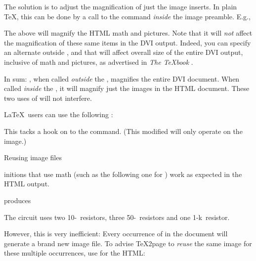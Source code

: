 {{{{{{{{{{{{{{The solution is to adjust the magnification of  just
the image inserts.  In plain \TeX, this can be
done by a call to the \p{\magnification} command {\em
inside} the image preamble.  E.g.,


\n The above will magnify the HTML math and pictures.
Note that it will {\em not} affect the magnification
of these same items in the DVI output.  Indeed,
you can specify an alternate \p{\magnification}
outside \p{\imgpreamble}, and that will affect
overall size of the entire DVI output, inclusive of
math and pictures, as advertised in {\em The \TeX book}
\cite{texbook}.

In sum: \p{\magnification}, when called {\em
outside} the \p{\imgpreamble}, magnifies the
entire DVI document.  When called {\em inside}
the \p{\imgpreamble}, it will magnify  just the
images in the HTML document.  These two uses
of \p{\magnification} will not interfere.

\LaTeX\ users can use the following%
\iffalse, but there
must be a better way\fi:

\p{
\ifx\shipout\UnDeFiNeD
  \imgpreamble
    \let\LaTeXdocument\document
    \def\document{\LaTeXdocument\Large}
  \endimgpreamble
\fi
}

This tacks a hook on to the \p{\document} command.
(This modified \p{\document} will only operate
on the image.)

\beginsection Reusing image files

%
\p{\def}initions that use math (such as the following
one for \p{\ohm}) work as expected in the
HTML output.


\n produces

\quote

\n The circuit uses two 10-\ohm\ resistors, three 50-\ohm\
resistors and one 1-k\ohm\ resistor.

\endquote


\n However, this is very inefficient: Every occurrence
of \p{\ohm} in the document will generate a brand new
image file.  To advise \TeX2page to {\em reuse}
the same image for these multiple occurrences, use
\p{\imgdef} for the HTML:

}}}}}}}}}}}}}}
